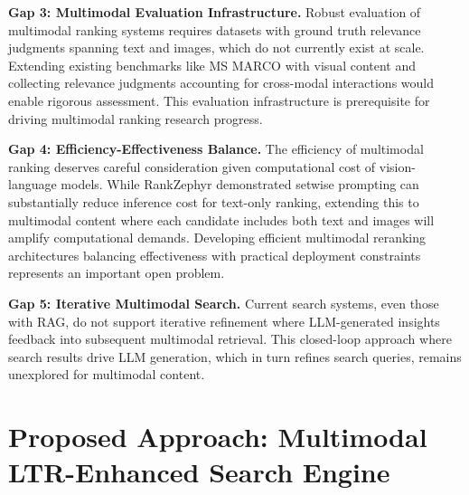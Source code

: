 \textbf{Gap 3: Multimodal Evaluation Infrastructure.} Robust evaluation of multimodal ranking systems requires datasets with ground truth relevance judgments spanning text and images, which do not currently exist at scale. Extending existing benchmarks like MS MARCO with visual content and collecting relevance judgments accounting for cross-modal interactions would enable rigorous assessment. This evaluation infrastructure is prerequisite for driving multimodal ranking research progress.

\textbf{Gap 4: Efficiency-Effectiveness Balance.} The efficiency of multimodal ranking deserves careful consideration given computational cost of vision-language models. While RankZephyr demonstrated setwise prompting can substantially reduce inference cost for text-only ranking, extending this to multimodal content where each candidate includes both text and images will amplify computational demands. Developing efficient multimodal reranking architectures balancing effectiveness with practical deployment constraints represents an important open problem.

\textbf{Gap 5: Iterative Multimodal Search.} Current search systems, even those with RAG, do not support iterative refinement where LLM-generated insights feedback into subsequent multimodal retrieval. This closed-loop approach where search results drive LLM generation, which in turn refines search queries, remains unexplored for multimodal content.

\section{Proposed Approach: Multimodal LTR-Enhanced Search Engine}

